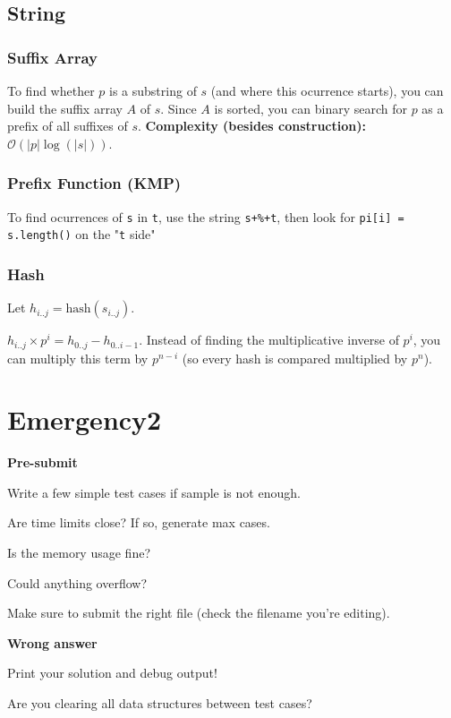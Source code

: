 \documentclass[12pt, a4paper, twoside]{article}
\newenvironment{allmono}{\ttfamily}{\par}
\begin{document}
\subsection{String}
\subsubsection{Suffix Array}
To find whether $p$ is a substring of $s$ (and where this ocurrence starts), you can build the suffix array $A$ of $s$. Since $A$ is sorted, you can binary search for $p$ as a prefix of all suffixes of $s$. \textbf{Complexity (besides construction):} $\mathcal{O}(\left|p\right|\log(\left|s\right|))$.

\subsubsection{Prefix Function (KMP)}
To find ocurrences of \texttt{s} in \texttt{t}, use the string \texttt{s+\%+t}, then look for \texttt{pi[i] = s.length()} on the "\texttt{t} side"

\subsubsection{Hash}
Let $h_{i..j} = \textrm{hash}(s_{i..j})$.

$h_{i..j}\times p^i = h_{0..j} - h_{0..i-1}$. Instead of finding the multiplicative inverse of $p^i$, you can multiply this term by $p^{n-i}$ (so every hash is compared multiplied by $p^n$).

\section{Emergency2}
\noindent
\textbf{Pre-submit}

\noindent
Write a few simple test cases if sample is not enough.

\noindent
Are time limits close? If so, generate max cases.

\noindent
Is the memory usage fine?

\noindent
Could anything overflow?

\noindent
Make sure to submit the right file (check the filename you're editing).

\noindent
\textbf{Wrong answer}

\noindent
Print your solution and debug output!

\noindent
Are you clearing all data structures between test cases?
\end{document}
